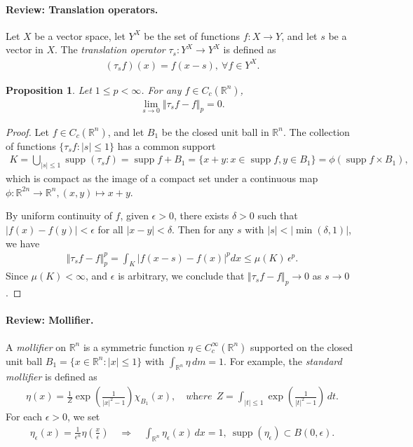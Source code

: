 \documentclass{article}
\numberwithin{equation}{section}
\newcommand{\bbR}{\mathbb{R}}
\DeclareMathOperator{\supp}{supp}
\theoremstyle{plain}
\newtheorem{proposition}[theorem]{Proposition}
\theoremstyle{definition}
\begin{document}
\paragraph{Review: Translation operators.} Let $X$ be a vector space, let $Y^X$ be the set of functions $f:X\to Y$, and let $s$ be a vector in $X$. The \textit{translation operator} $\tau_s:Y^X\to Y^X$ is defined as
\begin{align*}
	(\tau_s f)(x) = f(x-s),\ \forall f\in Y^X.
\end{align*}

\begin{proposition}\label{prop:1.5}
Let $1\leq p < \infty$. For any $f\in C_c(\mathbb{R}^n)$, 
\begin{align}
	\lim_{s\to 0} \Vert\tau_s f-f\Vert_p = 0.\label{eq:1.4}
\end{align}
\end{proposition}
\begin{proof}
	Let $f\in C_c(\mathbb{R}^n)$, and let $B_1$ be the closed unit ball in $\bbR^n$. The collection of functions $\{\tau_s f: \vert s\vert\leq 1\}$ has a common support
	\begin{align*}
		K = \bigcup_{\vert s\vert\leq 1}\supp(\tau_s f) = \supp f + B_1 = \{x+y:x\in\supp f, y\in B_1\} = \phi(\supp f\times B_1),
	\end{align*}
	which is compact as the image of a compact set under a continuous map $\phi:\mathbb{R}^{2n}\to\mathbb{R}^n,(x,y)\mapsto x+y$.

	By uniform continuity of $f$, given $\epsilon>0$, there exists $\delta > 0$ such that $\vert f(x) - f(y)\vert < \epsilon$ for all $\vert x-y\vert < \delta$. Then for any $s$ with $\vert s\vert<\left\vert\min(\delta,1)\right\vert$, we have
	\begin{align*}
		\Vert\tau_s f-f\Vert_p^p = \int_K \vert f(x-s) - f(x)\vert^p dx \leq \mu(K)\,\epsilon^p.
	\end{align*}
	Since $\mu(K)<\infty$, and $\epsilon$ is arbitrary, we conclude that $\Vert\tau_s f-f\Vert_p\to 0$ as $s\to 0$.
\end{proof}

\paragraph{Review: Mollifier.} A \textit{mollifier} on $\bbR^n$ is a symmetric function $\eta\in C_c^\infty(\bbR^n)$ supported on the closed unit ball $B_1=\{x\in\bbR^n:\vert x\vert\leq 1\}$ with $\int_{\bbR^n}\eta\,dm=1$. For example, the \textit{standard mollifier} is defined as
\begin{align*}
	\eta(x) = \frac{1}{Z}\exp\left(\frac{1}{\vert x\vert^2-1}\right)\chi_{B_1}(x),\quad\textit{where}\ \ Z=\int_{\vert t\vert\leq 1}\exp\left(\frac{1}{\vert t\vert^2-1}\right)\,dt.
\end{align*}
For each $\epsilon>0$, we set
\begin{align*}
	\eta_\epsilon(x)=\frac{1}{\epsilon^n}\eta\left(\frac{x}{\epsilon}\right)\quad\Rightarrow\quad \int_{\bbR^n}\eta_\epsilon(x)\,dx=1,\ \supp(\eta_\epsilon)\subset B(0,\epsilon).
\end{align*}
\end{document}
